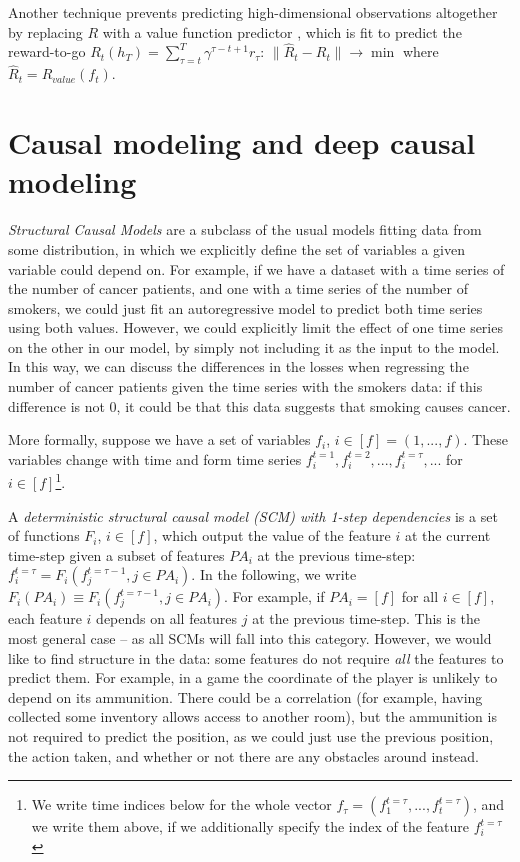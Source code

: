 \documentclass[a4paper,11pt,oneside]{report}
\begin{document}
Another technique prevents predicting high-dimensional observations altogether by replacing $R$ with a value function predictor \cite{Schrittwieser2019,Ayoub2020}, which is fit to predict the reward-to-go $R_t(h_T)=\sum\limits_{\tau=t}^{T}\gamma^{\tau-t+1}r_{\tau}$:
$\|\hat{R}_t-R_t\|\to\min$ where $\hat{R}_t=R_{value}(f_t)$.

\section{Causal modeling and deep causal modeling}
\label{sec:causal}
{\em Structural Causal Models} \cite{Runge2019,Wong2020,Guo2020} are a subclass of the usual models fitting data from some distribution, in which we explicitly define the set of variables a given variable could depend on. For example, if we have a dataset with a time series of the number of cancer patients, and one with a time series of the number of smokers, we could just fit an autoregressive model to predict both time series using both values. However, we could explicitly limit the effect of one time series on the other in our model, by simply not including it as the input to the model. In this way, we can discuss the differences in the losses when regressing the number of cancer patients given the time series with the smokers data: if this difference is not 0, it could be that this data suggests that smoking causes cancer.

More formally, suppose we have a set of variables $f_i$, $i\in[f]=(1, ..., f)$. These variables change with time and form time series $f_i^{t=1},f_i^{t=2},...,f_i^{t=\tau},...$ for $i\in[f]$\footnote{We write time indices below for the whole vector $f_{\tau}=(f_1^{t=\tau},...,f_t^{t=\tau})$, and we write them above, if we additionally specify the index of the feature $f_i^{t=\tau}$}.

A {\em deterministic structural causal model (SCM) with 1-step dependencies} is a set of functions $F_i$, $i\in[f]$, which output the value of the feature $i$ at the current time-step given a subset of features $PA_i$ at the previous time-step: $f_i^{t=\tau}=F_i(f_j^{t=\tau-1},j\in PA_i)$. In the following, we write $F_i(PA_i)\equiv F_i(f_j^{t=\tau-1},j\in PA_i)$. For example, if $PA_i=[f]$ for all $i\in[f]$, each feature $i$ depends on all features $j$ at the previous time-step. This is the most general case -- as all SCMs will fall into this category. However, we would like to find structure in the data: some features do not require {\em all} the features to predict them. For example, in a game the coordinate of the player is unlikely to depend on its ammunition. There could be a correlation (for example, having collected some inventory allows access to another room), but the ammunition is not required to predict the position, as we could just use the previous position, the action taken, and whether or not there are any obstacles around instead.
\end{document}
